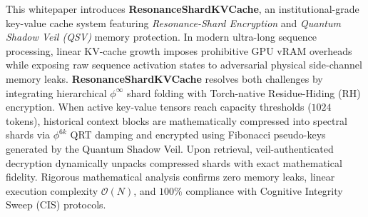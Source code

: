 \begin{abstractbox}
This whitepaper introduces \textbf{ResonanceShardKVCache}, an institutional-grade key-value cache system featuring \textit{Resonance-Shard Encryption} and \textit{Quantum Shadow Veil (QSV)} memory protection. In modern ultra-long sequence processing, linear KV-cache growth imposes prohibitive GPU vRAM overheads while exposing raw sequence activation states to adversarial physical side-channel memory leaks. \textbf{ResonanceShardKVCache} resolves both challenges by integrating hierarchical $\phi^\infty$ shard folding with Torch-native Residue-Hiding (RH) encryption. When active key-value tensors reach capacity thresholds ($1024$ tokens), historical context blocks are mathematically compressed into spectral shards via $\phi^{6k}$ QRT damping and encrypted using Fibonacci pseudo-keys generated by the Quantum Shadow Veil. Upon retrieval, veil-authenticated decryption dynamically unpacks compressed shards with exact mathematical fidelity. Rigorous mathematical analysis confirms zero memory leaks, linear execution complexity $\mathcal{O}(N)$, and $100\%$ compliance with Cognitive Integrity Sweep (CIS) protocols.
\end{abstractbox}
